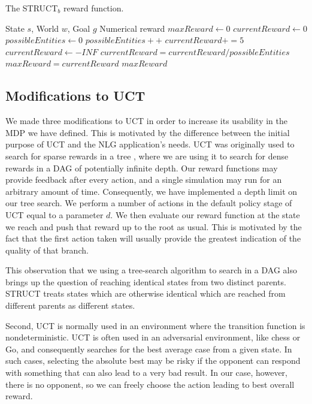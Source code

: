 \begin{algorithm}
\caption{The STRUCT$_b$ reward function.}\label{struct-b}
\begin{algorithmic}[1]
\REQUIRE State $s$, World $w$, Goal $g$
\ENSURE Numerical reward
\STATE $maxReward \gets 0$
	\STATE $currentReward \gets 0$
	\STATE $possibleEntities \gets 0$
			\STATE $possibleEntities++$
		\ENDIF
			\STATE $currentReward += 5$
		\ENDIF
		\ENDFOR
	\ENDFOR
		\STATE $currentReward \gets -INF$
	\ELSE
		\STATE $currentReward = currentReward / possibleEntities$
	\ENDIF
		\STATE $maxReward = currentReward$
	\ENDIF
\ENDFOR
\RETURN $maxReward$
\end{algorithmic}
\end{algorithm}

\subsection{Modifications to UCT}

We made three modifications to UCT in order to increase its usability
in the MDP we have defined.  This is motivated by the difference between
the initial purpose of UCT and the NLG application's needs.
UCT was originally used to search for sparse rewards
in a tree \cite{kocsis_bandit_2006}, where we are using it to search
for dense rewards in a DAG of potentially infinite depth.
Our reward functions may provide feedback after every action,
and a single simulation
may run for an arbitrary amount of time.
Consequently, we have implemented a depth limit
on our tree search.  We perform a number of actions in the
default policy stage of UCT equal to a parameter $d$.  We then
evaluate our reward function at the state we reach and push that
reward up to the root as usual.  This is motivated by the fact that the
first action taken will usually provide the greatest indication of the
quality of that branch.

This observation that we using a tree-search algorithm to search in a DAG
also brings up the question of reaching identical states
from two distinct parents.  STRUCT treats states which are otherwise
identical which are reached from different parents as different states.

Second, UCT is normally used in an environment where the transition
function is nondeterministic.  UCT is often used in an adversarial environment,
like chess or Go, and consequently searches for the best average case
from a given state.  In such cases,
selecting the absolute best may be risky if the opponent can respond
with something that can also lead to a very bad result. In our case,
however, there is no opponent, so we can freely choose the action
leading to best overall reward.

